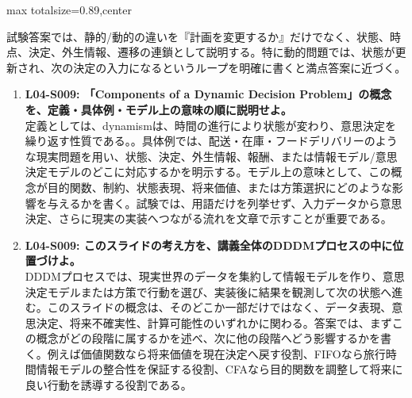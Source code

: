\begin{minipage}[t]{0.58\textwidth}
\begin{adjustbox}{max totalsize={\textwidth}{0.89\textheight},center}
\begin{minipage}{\textwidth}
試験答案では、静的/動的の違いを『計画を変更するか』だけでなく、状態、時点、決定、外生情報、遷移の連鎖として説明する。特に動的問題では、状態が更新され、次の決定の入力になるというループを明確に書くと満点答案に近づく。\par{}\begin{enumerate}\item \textbf{L04-S009: 「Components of a Dynamic Decision Problem」の概念を、定義・具体例・モデル上の意味の順に説明せよ。}\\定義としては、dynamismは、時間の進行により状態が変わり、意思決定を繰り返す性質である。。具体例では、配送・在庫・フードデリバリーのような現実問題を用い、状態、決定、外生情報、報酬、または情報モデル/意思決定モデルのどこに対応するかを明示する。モデル上の意味として、この概念が目的関数、制約、状態表現、将来価値、または方策選択にどのような影響を与えるかを書く。試験では、用語だけを列挙せず、入力データから意思決定、さらに現実の実装へつながる流れを文章で示すことが重要である。\item \textbf{L04-S009: このスライドの考え方を、講義全体のDDDMプロセスの中に位置づけよ。}\\DDDMプロセスでは、現実世界のデータを集約して情報モデルを作り、意思決定モデルまたは方策で行動を選び、実装後に結果を観測して次の状態へ進む。このスライドの概念は、そのどこか一部だけではなく、データ表現、意思決定、将来不確実性、計算可能性のいずれかに関わる。答案では、まずこの概念がどの段階に属するかを述べ、次に他の段階へどう影響するかを書く。例えば価値関数なら将来価値を現在決定へ戻す役割、FIFOなら旅行時間情報モデルの整合性を保証する役割、CFAなら目的関数を調整して将来に良い行動を誘導する役割である。\end{enumerate}
\end{minipage}
\end{adjustbox}
\end{minipage}


